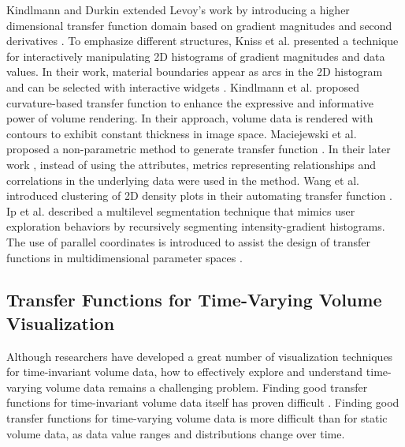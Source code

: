 Kindlmann and Durkin extended Levoy's work by introducing a higher dimensional transfer function domain based on gradient magnitudes and second derivatives \cite{kindlmann_semi-automatic_1998}. To emphasize different structures, Kniss et al. \cite{kniss_interactive_2001} presented a technique for interactively manipulating 2D histograms of gradient magnitudes and data values. In their work, material boundaries appear as arcs in the 2D histogram and can be selected with interactive widgets \cite{kniss_multidimensional_2002}.
Kindlmann et al. \cite{kindlmann_curvature-based_2003} proposed curvature-based transfer function to enhance the expressive and informative power of volume rendering. In their approach, volume data is rendered with contours to exhibit constant thickness in image space.
Maciejewski et al. proposed a non-parametric method to generate transfer function \cite{maciejewski_structuring_2009}.
In their later work \cite{maciejewski_abstracting_2013}, instead of using the attributes, metrics representing relationships and correlations in the underlying data were used in the method.
Wang et al. introduced clustering of 2D density plots in their automating transfer function \cite{wang_automating_2012}.
Ip et al. \cite{ip_hierarchical_2012} described a multilevel segmentation technique that mimics user exploration behaviors by recursively segmenting intensity-gradient histograms. The use of parallel coordinates is introduced to assist the design of transfer functions in multidimensional parameter spaces \cite{zhao_multi-dimensional_2010} \cite{guo_multi-dimensional_2011}.

\subsection{Transfer Functions for Time-Varying Volume Visualization}
Although researchers have developed a great number of visualization techniques for time-invariant volume data, how to effectively explore and understand time-varying volume data remains a challenging problem. Finding good transfer functions for time-invariant volume data itself has proven difficult \cite{pfister_transfer_2001}.
Finding good transfer functions for time-varying volume data is more difficult than for static volume data, as data value ranges and distributions change over time.

